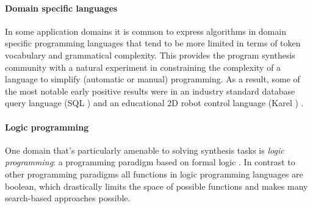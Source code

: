 \paragraph{Domain specific languages}

In some application domains it is common to express algorithms in domain specific programming languages \cite{fowlerDomainspecificLanguages2010, hudakDomainspecificLanguages1997, karsaiDesignGuidelinesDomain2014, kosarComparingGeneralpurposeDomainspecific2010, kosarDomainspecificLanguagesSystematic2016, mernikWhenHowDevelop2005} that tend to be more limited in terms of token vocabulary and grammatical complexity.
This provides the program synthesis community with a natural experiment in constraining the complexity of a language to simplify (automatic or manual) programming.
As a result, some of the most notable early positive results were in an industry standard database query language (SQL \cite{groffSQLCompleteReference2002}) \cite{liCanLlmAlready2024, yuSpiderLargescaleHumanlabeled2018} and an educational 2D robot control language (Karel \cite{pattisKarelRobotGentle1994}) \cite{metainduction}.

\paragraph{Logic programming}

One domain that's particularly amenable to solving synthesis tasks is \emph{logic programming}: a programming paradigm based on formal logic \cite{doetsLogicLogicProgramming1994, lloydFoundationsLogicProgramming2012}. 
In contrast to other programming paradigms \cite{floydParadigmsProgramming2007, gorodniaiaStudyProgrammingParadigms2016, krishnamurthi13ProgrammingParadigms2019, vanroyProgrammingParadigmsDummies2009} all functions in logic programming languages are boolean, which drastically limits the space of possible functions and makes many search-based approaches possible.





